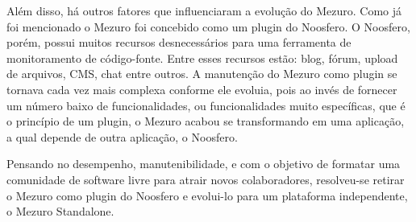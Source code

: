   
Além disso, há outros fatores que influenciaram a evolução do Mezuro. Como já foi mencionado o Mezuro foi concebido como um plugin do Noosfero. O Noosfero, porém, possui muitos recursos desnecessários para uma ferramenta de monitoramento de código-fonte. Entre esses recursos estão: blog, fórum, upload de arquivos, CMS, chat entre outros. A manutenção do Mezuro como plugin se tornava cada vez mais complexa conforme ele evoluia, pois ao invés de fornecer um número baixo de funcionalidades, ou funcionalidades muito específicas, que é o princípio de um plugin, o Mezuro acabou se transformando em uma aplicação, a qual depende de outra aplicação, o Noosfero. 

Pensando no desempenho, manutenibilidade, e com o objetivo de formatar uma comunidade de software livre para atrair novos colaboradores, resolveu-se retirar o Mezuro como plugin do Noosfero e evolui-lo para um plataforma independente, o Mezuro Standalone.
  

